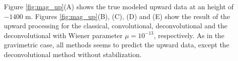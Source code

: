 Figure \ref{fig:mag_up}(A) shows the true modeled upward data at an height of $-1400$ m. Figures \ref{fig:mag_up}(B), (C), (D) and (E) show the result of the upward processing for the classical, convolutional, deconvolutional and the deconvolutional with Wiener parameter $\mu = 10^{-13}$, respectively. As in the gravimetric case, all methods seems to predict the upward data, except the deconvolutional method without stabilization.

%
%
%
%
